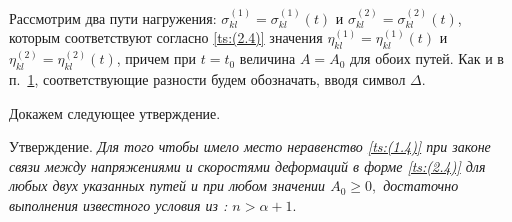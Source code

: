 Рассмотрим два пути нагружения: $\sigma_{kl}^{(1)}=\sigma_{kl}^{(1)}(t)$ и $\sigma_{kl}^{(2)}=\sigma_{kl}^{(2)}(t)$,  которым соответствуют согласно \eqref{ts:(2.4)}   значения $\eta_{kl}^{(1)}=\eta_{kl}^{(1)}(t)$ и $\eta_{kl}^{(2)}=\eta_{kl}^{(2)}(t)$, причем при $t=t_{0}$ величина $A=A_{0}$ для обоих путей. 
Как и в п.~\hyperlink{ts:1}{1}, соответствующие разности будем обозначать, вводя символ $\Delta$.

Докажем следующее утверждение.

\smallskip
{\small\sc Утверждение.} \it 
Для того чтобы имело место неравенство  \eqref{ts:(1.4)} при законе связи между напряжениями и скоростями деформаций в форме \eqref{ts:(2.4)} для любых двух указанных путей и при любом значении $A_{0}\geq0,$ достаточно выполнения известного условия из \rm \cite{ts:Shesterikov}: $n>\alpha+1.$


\smallskip \rm 

